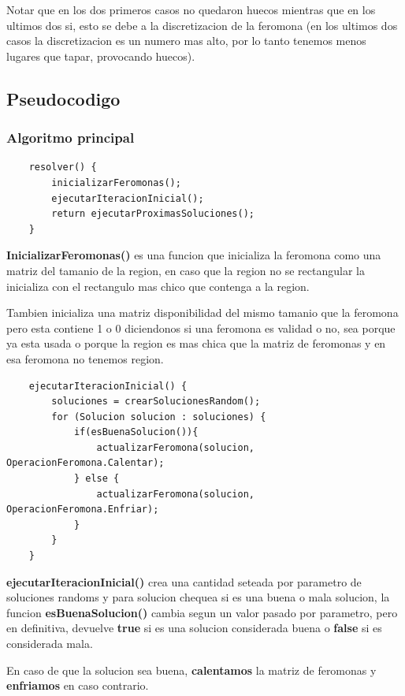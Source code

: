 Notar que en los dos primeros casos no quedaron huecos mientras que en los ultimos dos si, esto se debe a la discretizacion de la feromona (en los ultimos dos casos la discretizacion es un numero mas alto, por lo tanto tenemos menos lugares que tapar, provocando huecos).

\newpage


\subsection{Pseudocodigo}
\subsubsection{Algoritmo principal}

\begin{verbatim}
    resolver() {
        inicializarFeromonas();
        ejecutarIteracionInicial();
        return ejecutarProximasSoluciones();
    }
\end{verbatim}

\textbf{InicializarFeromonas()} es una funcion que inicializa la feromona como una matriz del tamanio de la region, en caso que la region no se rectangular la inicializa con el rectangulo mas chico que contenga a la region. 

Tambien inicializa una matriz disponibilidad del mismo tamanio que la feromona pero esta contiene 1 o 0 diciendonos si una feromona es validad o no, sea porque ya esta usada o porque la region es mas chica que la matriz de feromonas y en esa feromona no tenemos region.


\begin{verbatim}
    ejecutarIteracionInicial() {
        soluciones = crearSolucionesRandom();
        for (Solucion solucion : soluciones) {
            if(esBuenaSolucion()){
                actualizarFeromona(solucion, OperacionFeromona.Calentar);
            } else {
                actualizarFeromona(solucion, OperacionFeromona.Enfriar);
            }
        }
    }
\end{verbatim}		

\textbf{ejecutarIteracionInicial()} crea una cantidad seteada por parametro de soluciones randoms y para solucion chequea si es una buena o mala solucion, la funcion \textbf{esBuenaSolucion()} cambia segun un valor pasado por parametro, pero en definitiva, devuelve \textbf{true} si es una solucion considerada buena o \textbf{false} si es considerada mala. 

En caso de que la solucion sea buena, \textbf{calentamos} la matriz de feromonas y \textbf{enfriamos} en caso contrario.

